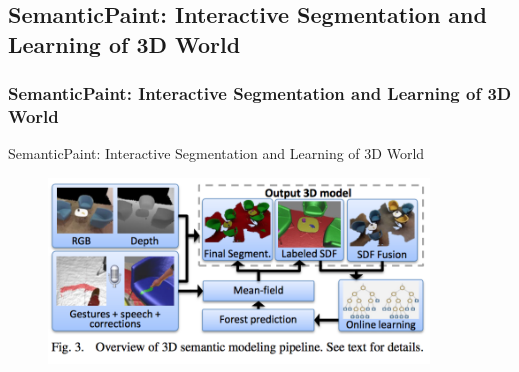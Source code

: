 \subsection{SemanticPaint: Interactive Segmentation and Learning of 3D World}
\frame
{
	\frametitle{SemanticPaint: Interactive Segmentation and Learning of 3D World}
	SemanticPaint: Interactive Segmentation and Learning of 3D World \cite{Valentin:2015}
	\begin{figure}
		\centering
		\includegraphics[width=0.9\textwidth]{img/semanticpaint/pipeline.png}
	\end{figure}
	
}
\frame
